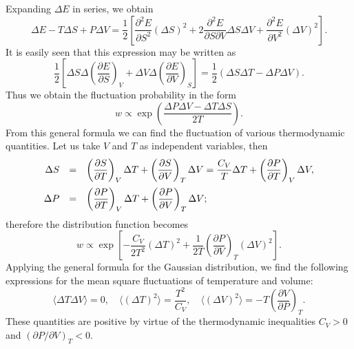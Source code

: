 \documentclass{book}
\newcommand{\average}[1]{\langle#1\rangle}
\numberwithin{equation}{section}
\begin{document}
Expanding $\Delta E$ in series, we obtain
\begin{equation}
  \Delta E-T\Delta S+P\Delta V=\frac{1}{2}\left[
    \frac{\partial^2E}{\partial S^2}(\Delta S)^2+
    2\frac{\partial^2E}{\partial S\partial V}\Delta S\Delta V+
    \frac{\partial^2E}{\partial V^2}(\Delta V)^2\right].
\end{equation}
It is easily seen that this expression may be written as
\begin{equation}
  \frac{1}{2}\left[
    \Delta S\Delta\left(\frac{\partial E}{\partial S}\right)_V+
    \Delta V\Delta\left(\frac{\partial E}{\partial V}\right)_S\right]
  =\frac{1}{2}(\Delta S\Delta T-\Delta P\Delta V).
\end{equation}
Thus we obtain the fluctuation probability in the form
\begin{equation}
  w\propto\exp\left(\frac{\Delta P\Delta V-\Delta T\Delta S}{2T}\right).
\end{equation}
From this general formula we can find the fluctuation of various
thermodynamic quantities. Let us take $V$ and $T$ as independent
variables, then
\begin{equation}
  \begin{array}{rcl}
    \Delta S&=&\displaystyle\left(\frac{\partial S}{\partial T}\right)_V\Delta T
    +\left(\frac{\partial S}{\partial V}\right)_T\Delta V=
    \frac{C_V}{T}\Delta T+\left(\frac{\partial P}{\partial T}\right)_V\Delta V,
    \\\vbox to 20pt{}
    \Delta P&=&\displaystyle\left(\frac{\partial P}{\partial T}\right)_V
    \Delta T+\left(\frac{\partial P}{\partial V}\right)_T\Delta V;
  \end{array}
\end{equation}
therefore the distribution function becomes
\begin{equation}
  w\propto\exp\left[-\frac{C_V}{2T^2}(\Delta T)^2+\frac{1}{2T}
    \left(\frac{\partial P}{\partial V}\right)_T(\Delta V)^2\right].
\end{equation}
Applying the general formula for the Gaussian distribution, we find
the following expressions for the mean square fluctuations of temperature
and volume:
\begin{equation}
  \average{\Delta T\Delta V}=0,\quad
  \average{(\Delta T)^2}=\frac{T^2}{C_V},\quad
  \average{(\Delta V)^2}=-T\left(\frac{\partial V}{\partial P}\right)_T.
\end{equation}
These quantities are positive by virtue of the thermodynamic inequalities 
$C_V>0$ and $(\partial P/\partial V)_T<0$.
\end{document}
